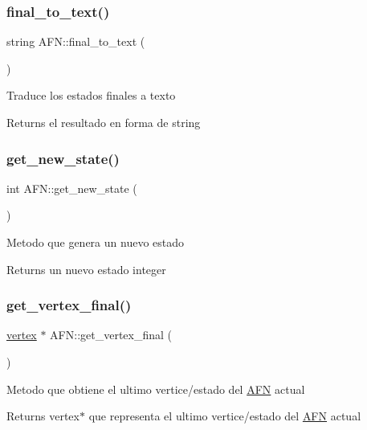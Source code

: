 \subsubsection{\texorpdfstring{final\+\_\+to\+\_\+text()}{final\_to\_text()}}
{\footnotesize\ttfamily string A\+F\+N\+::final\+\_\+to\+\_\+text (\begin{DoxyParamCaption}{ }\end{DoxyParamCaption})}

Traduce los estados finales a texto \begin{DoxyReturn}{Returns}
el resultado en forma de string 
\end{DoxyReturn}
\hypertarget{class_a_f_n_a7842487528b1348a74d2344fb2372724}{}\label{class_a_f_n_a7842487528b1348a74d2344fb2372724} 
\subsubsection{\texorpdfstring{get\+\_\+new\+\_\+state()}{get\_new\_state()}}
{\footnotesize\ttfamily int A\+F\+N\+::get\+\_\+new\+\_\+state (\begin{DoxyParamCaption}{ }\end{DoxyParamCaption})}

Metodo que genera un nuevo estado \begin{DoxyReturn}{Returns}
un nuevo estado integer 
\end{DoxyReturn}
\hypertarget{class_a_f_n_ab9faaf309736a0fab9f050f17dae8237}{}\label{class_a_f_n_ab9faaf309736a0fab9f050f17dae8237} 
\subsubsection{\texorpdfstring{get\+\_\+vertex\+\_\+final()}{get\_vertex\_final()}}
{\footnotesize\ttfamily \hyperlink{structvertex}{vertex} $\ast$ A\+F\+N\+::get\+\_\+vertex\+\_\+final (\begin{DoxyParamCaption}{ }\end{DoxyParamCaption})}

Metodo que obtiene el ultimo vertice/estado del \hyperlink{class_a_f_n}{A\+FN} actual \begin{DoxyReturn}{Returns}
vertex$\ast$ que representa el ultimo vertice/estado del \hyperlink{class_a_f_n}{A\+FN} actual 
\end{DoxyReturn}
\hypertarget{class_a_f_n_aa15d816a92521edd560d7de61696a090}{}\label{class_a_f_n_aa15d816a92521edd560d7de61696a090} 
